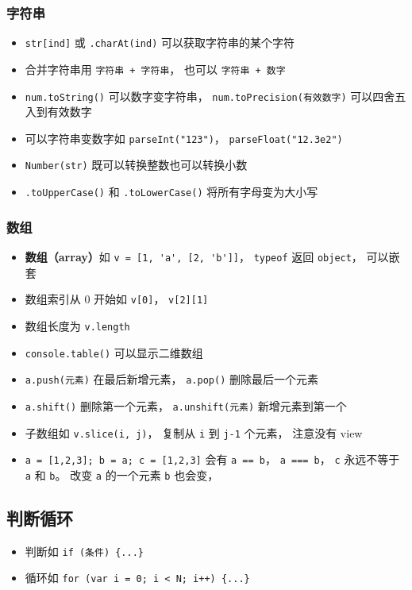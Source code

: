 \subsubsection{字符串}
\begin{itemize}
\item \verb|str[ind]| 或 \verb|.charAt(ind)| 可以获取字符串的某个字符
\item 合并字符串用 \verb|字符串 + 字符串|， 也可以 \verb|字符串 + 数字|
\item \verb|num.toString()| 可以数字变字符串， \verb|num.toPrecision(有效数字)| 可以四舍五入到有效数字
\item 可以字符串变数字如 \verb|parseInt("123")|， \verb|parseFloat("12.3e2")|
\item \verb|Number(str)| 既可以转换整数也可以转换小数
\item \verb|.toUpperCase()| 和 \verb|.toLowerCase()| 将所有字母变为大小写
\end{itemize}


\subsubsection{数组}
\begin{itemize}
\item \textbf{数组（array）}如 \verb|v = [1, 'a', [2, 'b']]|， \verb|typeof| 返回 \verb|object|， 可以嵌套
\item 数组索引从 0 开始如 \verb|v[0]|， \verb|v[2][1]|
\item 数组长度为 \verb|v.length|
\item \verb|console.table()| 可以显示二维数组
\item \verb|a.push(元素)| 在最后新增元素， \verb|a.pop()| 删除最后一个元素
\item \verb|a.shift()| 删除第一个元素， \verb|a.unshift(元素)| 新增元素到第一个
\item 子数组如 \verb|v.slice(i, j)|， 复制从 \verb|i| 到 \verb|j-1| 个元素， 注意没有 view
\item \verb|a = [1,2,3]; b = a; c = [1,2,3]| 会有 \verb|a == b|， \verb|a === b|， \verb|c| 永远不等于 \verb|a| 和 \verb|b|。 改变 \verb|a| 的一个元素 \verb|b| 也会变， 
\end{itemize}

\subsection{判断循环}
\begin{itemize}
\item 判断如 \verb|if (条件) {...}|
\item 循环如 \verb|for (var i = 0; i < N; i++) {...}|
\end{itemize}

